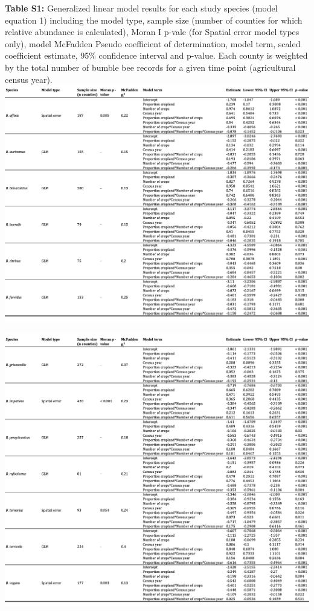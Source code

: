 \documentclass[11pt,]{article}
\begin{document}
\textbf{Table S1:} Generalized linear model results for each study
species (model equation 1) including the model type, sample size (number
of counties for which relative abundance is calculated), Moran I p-vale
(for Spatial error model types only), model McFadden Pseudo coefficient
of determination, model term, scaled coefficient estimate, 95\%
confidence interval and p-value. Each county is weighted by the total
number of bumble bee records for a given time point (agricultural census
year).
\includegraphics[width=1\textwidth,height=\textheight]{../ms_figs/table_s1_a.png}
\clearpage

\newpage

\includegraphics[width=1\textwidth,height=\textheight]{../ms_figs/table_s1_b.png}
\end{document}
